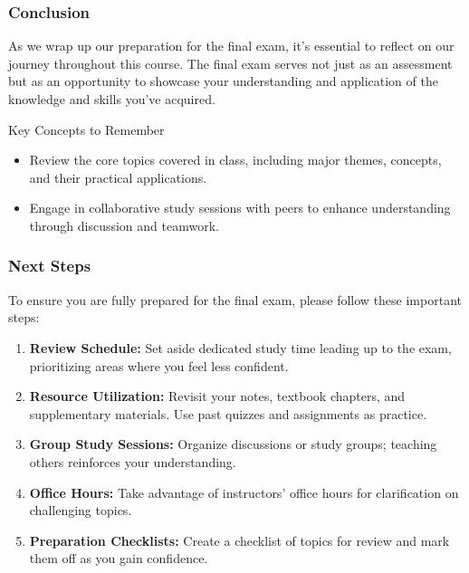 \documentclass[aspectratio=169]{beamer}
\begin{document}
\begin{frame}[fragile]
    \frametitle{Conclusion}
    As we wrap up our preparation for the final exam, it's essential to reflect on our journey throughout this course. The final exam serves not just as an assessment but as an opportunity to showcase your understanding and application of the knowledge and skills you've acquired.

    \begin{block}{Key Concepts to Remember}
        \begin{itemize}
            \item Review the core topics covered in class, including major themes, concepts, and their practical applications.
            \item Engage in collaborative study sessions with peers to enhance understanding through discussion and teamwork.
        \end{itemize}
    \end{block}
\end{frame}

\begin{frame}[fragile]
    \frametitle{Next Steps}
    To ensure you are fully prepared for the final exam, please follow these important steps:

    \begin{enumerate}
        \item \textbf{Review Schedule:} Set aside dedicated study time leading up to the exam, prioritizing areas where you feel less confident.
        \item \textbf{Resource Utilization:} Revisit your notes, textbook chapters, and supplementary materials. Use past quizzes and assignments as practice.
        \item \textbf{Group Study Sessions:} Organize discussions or study groups; teaching others reinforces your understanding.
        \item \textbf{Office Hours:} Take advantage of instructors' office hours for clarification on challenging topics.
        \item \textbf{Preparation Checklists:} Create a checklist of topics for review and mark them off as you gain confidence.
    \end{enumerate}
\end{frame}
\end{document}
